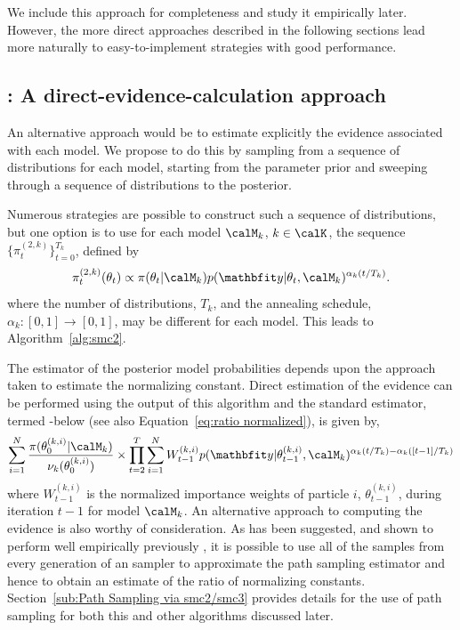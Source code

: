 We include this approach for completeness and study it empirically later.
However, the more direct approaches described in the following sections lead
more naturally to easy-to-implement strategies with good performance.

\subsection[SMC2: A direct-evidence-calculation approach]
{\smc[2]: A direct-evidence-calculation approach}
\label{sub:smc2: A direct-evidence-calculation approach}

An alternative approach would be to estimate explicitly the evidence
associated with each model. We propose to do this by sampling from a sequence
of distributions for each model, starting from the parameter prior and
sweeping through a sequence of distributions to the posterior.

Numerous strategies are possible to construct such a sequence of
distributions, but one option is to use for each model $\calM_k$, $k\in\calK$,
the sequence $\{\pi_t^{(2,k)}\}_{t=0}^{T_k}$, defined by
\begin{equation}
  \pi_t^{(2,k)}(\theta_t) \propto
  \pi(\theta_t|\calM_k)p(\data|\theta_t,\calM_k)^{\alpha_k(t/T_k)}.
  \label{eq:geometry_2}
\end{equation}
where the number of distributions, $T_k$, and the annealing schedule,
$\alpha_k:[0,1]\to[0,1]$, may be different for each model. This leads to
Algorithm~\ref{alg:smc2}.



The estimator of the posterior model probabilities depends upon the approach
taken to estimate the normalizing constant. Direct estimation of the evidence
can be performed using the output of this \smc algorithm and the standard
estimator, termed \smc[2]-\ds below (see also Equation~\eqref{eq:ratio
  normalized}), is given by,
\begin{equation}
  \sum_{i=1}^N \frac{\pi(\theta_0^{(k,i)}|\calM_k)}{\nu_k(\theta_0^{(k,i)})}
  \times \prod_{t=2}^T \sum_{i=1}^N W_{t-1}^{(k,i)}
  p(\data|\theta_{t-1}^{(k,i)},\calM_k)^{\alpha_k(t/T_k) - \alpha_k([t-1]/T_k)}
  \label{eq:smc2-ds}
\end{equation}
where $W_{t-1}^{(k,i)}$ is the normalized importance weights of particle $i$,
$\theta_{t-1}^{(k,i)}$, during iteration $t-1$ for model $\calM_k$. An
alternative approach to computing the evidence is also worthy of
consideration. As has been suggested, and shown to perform well empirically
previously \cite{Johansen:2006wm}, it is possible to use all
of the samples from every generation of an \smc sampler to approximate the
path sampling estimator and hence to obtain an estimate of the ratio of
normalizing constants. Section~\ref{sub:Path Sampling via smc2/smc3} provides
details for the use of path sampling for both this and other \smc algorithms
discussed later.

